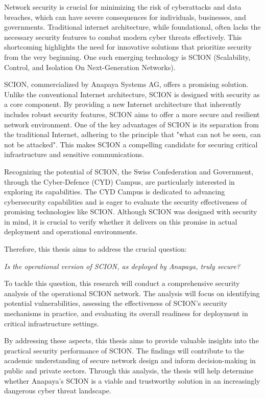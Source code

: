 Network security is crucial for minimizing the risk of cyberattacks and data breaches, which can have severe consequences for individuals, businesses, and governments.
Traditional internet architecture, while foundational, often lacks the necessary security features to combat modern cyber threats effectively.
This shortcoming highlights the need for innovative solutions that prioritize security from the very beginning.
One such emerging technology is SCION (Scalability, Control, and Isolation On Next-Generation Networks).

SCION, commercialized by Anapaya Systems AG, offers a promising solution.
Unlike the conventional Internet architecture, SCION is designed with security as a core component.
By providing a new Internet architecture that inherently includes robust security features, SCION aims to offer a more secure and resilient network environment.
One of the key advantages of SCION is its separation from the traditional Internet, adhering to the principle that "what can not be seen, can not be attacked".
This makes SCION a compelling candidate for securing critical infrastructure and sensitive communications.

Recognizing the potential of SCION, the Swiss Confederation and Government, through the Cyber-Defence (CYD) Campus, are particularly interested in exploring its capabilities.
The CYD Campus is dedicated to advancing cybersecurity capabilities and is eager to evaluate the security effectiveness of promising technologies like SCION.
Although SCION was designed with security in mind, it is crucial to verify whether it delivers on this promise in actual deployment and operational environments.

Therefore, this thesis aims to address the crucial question:
\begin{center}
    \textit{Is the operational version of SCION, as deployed by Anapaya, truly secure?}
\end{center}

To tackle this question, this research will conduct a comprehensive security analysis of the operational SCION network.
The analysis will focus on identifying potential vulnerabilities, assessing the effectiveness of SCION's security mechanisms in practice, and evaluating its overall readiness for deployment in critical infrastructure settings.

By addressing these aspects, this thesis aims to provide valuable insights into the practical security performance of SCION.
The findings will contribute to the academic understanding of secure network design and inform decision-making in public and private sectors.
Through this analysis, the thesis will help determine whether Anapaya's SCION is a viable and trustworthy solution in an increasingly dangerous cyber threat landscape.



